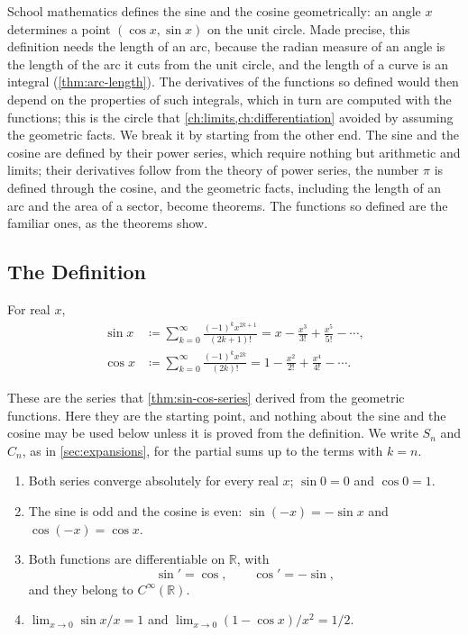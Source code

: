 School mathematics defines the sine and the cosine geometrically: an angle $x$ determines a point $(\cos x,\sin x)$ on the unit circle. Made precise, this definition needs the length of an arc, because the radian measure of an angle is the length of the arc it cuts from the unit circle, and the length of a curve is an integral (\cref{thm:arc-length}). The derivatives of the functions so defined would then depend on the properties of such integrals, which in turn are computed with the functions; this is the circle that \cref{ch:limits,ch:differentiation} avoided by assuming the geometric facts. We break it by starting from the other end. The sine and the cosine are defined by their power series, which require nothing but arithmetic and limits; their derivatives follow from the theory of power series, the number $\pi$ is defined through the cosine, and the geometric facts, including the length of an arc and the area of a sector, become theorems. The functions so defined are the familiar ones, as the theorems show.

\subsection{The Definition}

\begin{definition}
\label{def:sin-cos}
For real $x$,
\begin{align*}
\sin x&\coloneqq\sum_{k=0}^\infty\frac{(-1)^kx^{2k+1}}{(2k+1)!}=x-\frac{x^3}{3!}+\frac{x^5}{5!}-\cdots,\\
\cos x&\coloneqq\sum_{k=0}^\infty\frac{(-1)^kx^{2k}}{(2k)!}=1-\frac{x^2}{2!}+\frac{x^4}{4!}-\cdots .
\end{align*}
\end{definition}

These are the series that \cref{thm:sin-cos-series} derived from the geometric functions. Here they are the starting point, and nothing about the sine and the cosine may be used below unless it is proved from the definition. We write $S_n$ and $C_n$, as in \cref{sec:expansions}, for the partial sums up to the terms with $k=n$.

\begin{proposition}
\label{prop:sin-cos-basic}
\leavevmode
\begin{enumerate}
\item Both series converge absolutely for every real $x$; $\sin0=0$ and $\cos0=1$.
\item The sine is odd and the cosine is even: $\sin(-x)=-\sin x$ and $\cos(-x)=\cos x$.
\item Both functions are differentiable on $\mathbb R$, with
\[
\sin'=\cos,\qquad\cos'=-\sin ,
\]
and they belong to $C^\infty(\mathbb R)$.
\item $\lim_{x\to0}\sin x/x=1$ and $\lim_{x\to0}(1-\cos x)/x^2=1/2$.
\end{enumerate}
\end{proposition}

